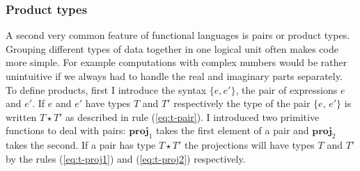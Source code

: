 \documentclass[12pt,twoside,notitlepage]{report}
\theoremstyle{plain}%
\theoremstyle{definition}
\theoremstyle{remark}
\begin{document}
\subsubsection{Product types}
A second very common feature of functional languages is pairs or product types. Grouping different types of data together in one logical unit often makes code more simple. For example computations with complex numbers would be rather unintuitive if we always had to handle the real and imaginary parts separately. To define products, first I introduce the syntax $ \{e, e' \} $, the pair of expressions $ e $ and $ e' $. If $ e $ and $ e' $ have types $ T $ and $ T' $ respectively the type of the pair $ \{e,\, e'\} $ is written $ T\star T' $ as described in rule (\ref{eq:t-pair}). I introduced two primitive functions to deal with pairs: $ \textbf{proj}_1 $ takes the first element of a pair and $ \textbf{proj}_2 $ takes the second. If a pair has type  $ T\star T' $ the projections will have types $ T $ and $ T' $ by the rules (\ref{eq:t-proj1}) and (\ref{eq:t-proj2}) respectively.
\end{document}
